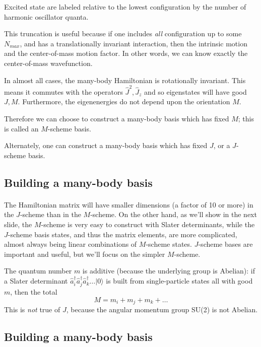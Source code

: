 Excited state are labeled relative to the lowest configuration by the 
number of harmonic oscillator quanta.

This truncation is useful because if one includes \emph{all} configuration up to 
some $N_{max}$, and has a translationally invariant interaction, then the intrinsic 
motion and the center-of-mass motion factor. In other words, we can know exactly 
the center-of-mass wavefunction. 

In almost all cases, the many-body Hamiltonian is rotationally invariant. This means 
it commutes with the operators $\hat{J}^2, \hat{J}_z$ and so eigenstates will have 
good $J,M$. Furthermore, the eigenenergies do not depend upon the orientation $M$. 

Therefore we can choose to construct a many-body basis which has fixed $M$; this is 
called an $M$-scheme basis. 

Alternately, one can construct a many-body basis which has fixed $J$, or a $J$-scheme 
basis.



\subsection*{Building a many-body basis}

\paragraph{}
The Hamiltonian matrix will have smaller dimensions (a factor of 10 or more) in the $J$-scheme than in the $M$-scheme. 
On the other hand, as we'll show in the next slide, the $M$-scheme is very easy to 
construct with Slater determinants, while the $J$-scheme basis states, and thus the 
matrix elements, are more complicated, almost always being linear combinations of 
$M$-scheme states. $J$-scheme bases are important and useful, but we'll focus on the 
simpler $M$-scheme.

The quantum number $m$ is additive (because the underlying group is Abelian): 
if a Slater determinant $\hat{a}_i^\dagger \hat{a}^\dagger_j \hat{a}^\dagger_k \ldots | 0 \rangle$ 
is built from single-particle states all with good $m$, then the total 
\[
M = m_i + m_j + m_k + \ldots
\]
This is \emph{not} true of $J$, because the angular momentum group SU(2) is not Abelian.



\subsection*{Building a many-body basis}

